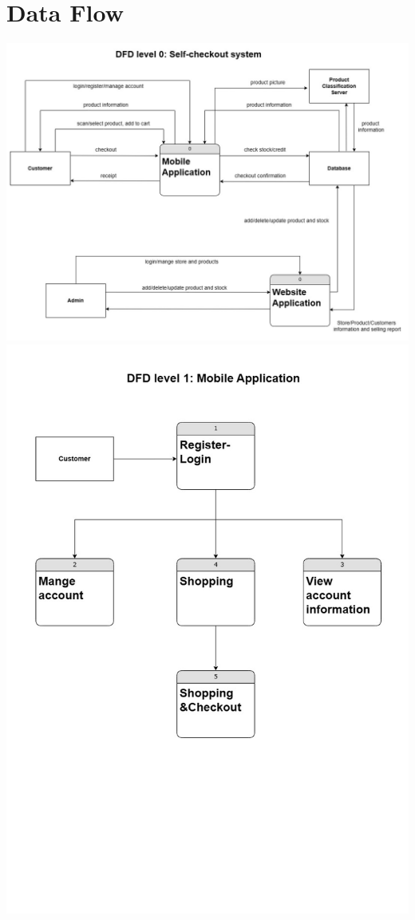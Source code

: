 \chapter{Data Flow}

\begin{center}

    \includegraphics[scale=0.25]{pic/dataflow/dataflow-0.jpg}\\
    \vspace{2cm}
    \includegraphics[scale=0.25]{pic/dataflow/dataflow-mobile1.jpg}

\end{center}
